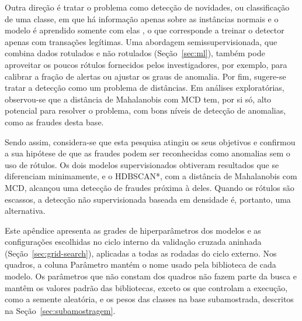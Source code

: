 \documentclass{uflamon}          %
\begin{document}
Outra direção é tratar o problema como detecção de novidades, ou classificação de uma classe, em que há informação apenas sobre as instâncias normais e o modelo é aprendido somente com elas \cite{ghosh2024}, o que corresponde a treinar o detector apenas com transações legítimas. Uma abordagem semissupervisionada, que combina dados rotulados e não rotulados (Seção~\ref{sec:ml}), também pode aproveitar os poucos rótulos fornecidos pelos investigadores, por exemplo, para calibrar a fração de alertas ou ajustar os graus de anomalia. Por fim, sugere-se tratar a detecção como um problema de distâncias. Em análises exploratórias, observou-se que a distância de Mahalanobis com MCD tem, por si só, alto potencial para resolver o problema, com bons níveis de detecção de anomalias, como as fraudes desta base.

Sendo assim, considera-se que esta pesquisa atingiu os seus objetivos e confirmou a sua hipótese de que as fraudes podem ser reconhecidas como anomalias sem o uso de rótulos. Os dois modelos supervisionados obtiveram resultados que se diferenciam minimamente, e o HDBSCAN*, com a distância de Mahalanobis com MCD, alcançou uma detecção de fraudes próxima à deles. Quando os rótulos são escassos, a detecção não supervisionada baseada em densidade é, portanto, uma alternativa.


        

\label{ap:hiperparametros}

Este apêndice apresenta as grades de hiperparâmetros dos modelos e as configurações escolhidas no ciclo interno da validação cruzada aninhada (Seção~\ref{sec:grid-search}), aplicadas a todas as rodadas do ciclo externo. Nos quadros, a coluna Parâmetro mantém o nome usado pela biblioteca de cada modelo. Os parâmetros que não constam dos quadros não fazem parte da busca e mantêm os valores padrão das bibliotecas, exceto os que controlam a execução, como a semente aleatória, e os pesos das classes na base subamostrada, descritos na Seção~\ref{sec:subamostragem}.
\end{document}
